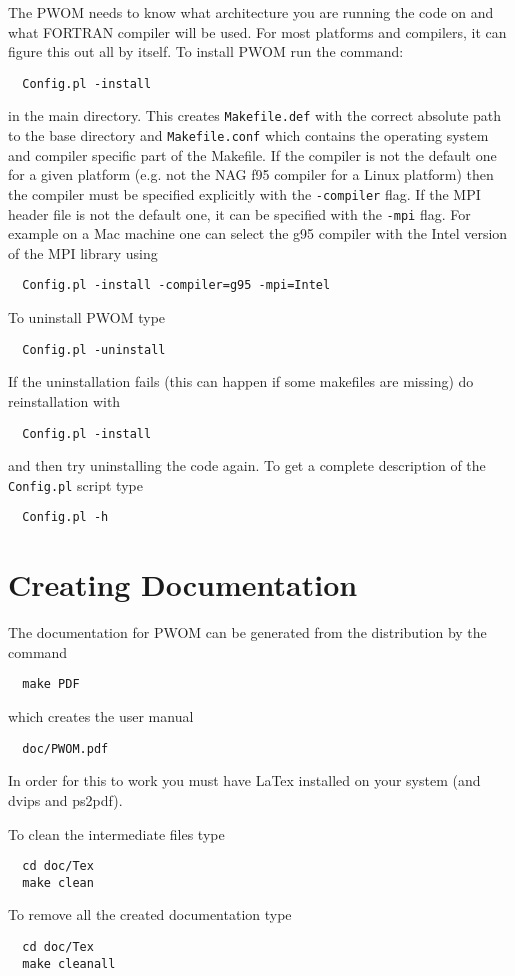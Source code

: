 The PWOM needs to know what architecture you are running the code on
and what FORTRAN compiler will be used.  For most platforms and compilers,
it can figure this out all by itself. To install PWOM run the command:
\begin{verbatim}
  Config.pl -install
\end{verbatim}
in the main directory. This creates {\tt Makefile.def} with
the correct absolute path to the base directory and {\tt Makefile.conf}
which contains the operating system and compiler specific part of
the Makefile. If the compiler is not the default one for a given
platform (e.g. not the NAG f95 compiler for a Linux platform) then
the compiler must be specified explicitly with the {\tt -compiler}
flag. If the MPI header file is not the default one, it can be
specified with the {\tt -mpi} flag. For example on a Mac machine
one can select the g95 compiler with the Intel version of the 
MPI library using
\begin{verbatim}
  Config.pl -install -compiler=g95 -mpi=Intel
\end{verbatim}
To uninstall PWOM type
\begin{verbatim}
  Config.pl -uninstall
\end{verbatim}
If the uninstallation fails (this can happen if some makefiles are missing)
do reinstallation with
\begin{verbatim}
  Config.pl -install
\end{verbatim}
and then try uninstalling the code again.
To get a complete description of the {\tt Config.pl}  script type
\begin{verbatim}
  Config.pl -h
\end{verbatim}

\section{Creating Documentation}

The documentation for PWOM can be generated from the distribution by
the command
\begin{verbatim}
  make PDF
\end{verbatim}
which creates the user manual
\begin{verbatim}
  doc/PWOM.pdf
\end{verbatim}
In order for this to work you must have
LaTex installed on your system (and dvips and ps2pdf).  

To clean the intermediate files type
\begin{verbatim}
  cd doc/Tex
  make clean
\end{verbatim}
To remove all the created documentation type
\begin{verbatim}
  cd doc/Tex
  make cleanall
\end{verbatim}

